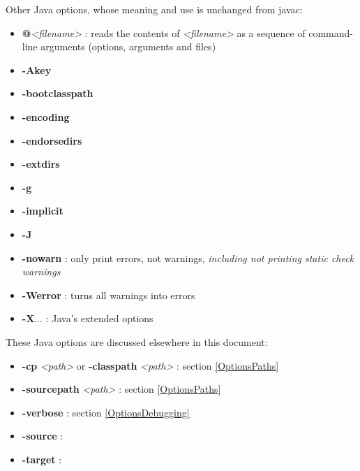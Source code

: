 Other Java options, whose meaning and use is unchanged from javac:
\begin{itemize}
\item \textbf{@}\textit{<filename>} : reads the contents of \textit{<filename>} as a sequence of command-line arguments (options, arguments and files)
\item \textbf{-Akey}
\item \textbf{-bootclasspath}
\item \textbf{-encoding}
\item \textbf{-endorsedirs}
\item \textbf{-extdirs}
\item \textbf{-g}
\item \textbf{-implicit}
\item \textbf{-J}
\item \textbf{-nowarn} : only print errors, not warnings, \textit{including not printing static check warnings}
\item \textbf{-Werror} : turns all warnings into errors
\item \textbf{-X}... : Java's extended options
\end{itemize}

These Java options are discussed elsewhere in this document:
\begin{itemize}
\item \textbf{-cp} \textit{<path>} or \textbf{-classpath} \textit{<path>} : section \ref{OptionsPaths}
\item \textbf{-sourcepath} \textit{<path>} : section \ref{OptionsPaths}
\item \textbf{-verbose} : section \ref{OptionsDebugging}
\item \textbf{-source} :  
\item \textbf{-target} :  
\end{itemize}


